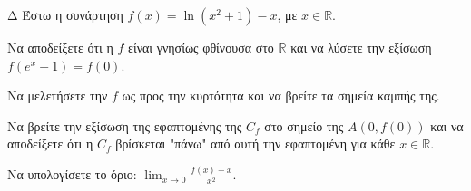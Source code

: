 \begin{thema}{Δ}
Έστω η συνάρτηση $f(x) = \ln(x^2+1) - x$, με $x \in \mathbb{R}$.
\begin{erwthma}
    \item Να αποδείξετε ότι η $f$ είναι γνησίως φθίνουσα στο $\mathbb{R}$ και να λύσετε την εξίσωση $f(e^x - 1) = f(0)$.
    \item Να μελετήσετε την $f$ ως προς την κυρτότητα και να βρείτε τα σημεία καμπής της.
    \item Να βρείτε την εξίσωση της εφαπτομένης της $C_f$ στο σημείο της $A(0, f(0))$ και να αποδείξετε ότι η $C_f$ βρίσκεται "πάνω" από αυτή την εφαπτομένη για κάθε $x \in \mathbb{R}$.
    \item Να υπολογίσετε το όριο: $\displaystyle \lim_{x\to 0} \frac{f(x) + x}{x^2}$.
\end{erwthma}
\end{thema}
